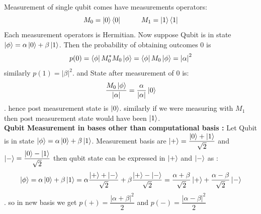 \documentclass[11 pt]{article}
\theoremstyle{definition}
\theoremstyle{remark}
\begin{document}
Measurement of single qubit comes have measurements operators:
$$M_0 = \ket{0}\bra{0} \hspace{1cm} M_1 = \ket{1}\bra{1}$$
Each measurement operators is Hermitian. Now suppose Qubit is in state $\ket{\phi} = \alpha\ket{0} + \beta\ket{1}$. Then the probability of obtaining outcomes 0 is
$$p(0) = \bra{\phi}M_0^{*}M_0\ket{\phi} =\bra{\phi}M_0\ket{\phi} = \left|\alpha\right |^2 $$
similarly $p(1) = \left|\beta\right|^2$. and State after measurement of 0 is:
$$\dfrac{M_0\ket{\phi}}{\left|\alpha\right |} = \dfrac{\alpha}{\left|\alpha\right |}\ket{0}$$.
hence post measurement state is $\ket{0}$. similarly if we were measuring with $M_1$ then post measurement state would have been $\ket{1}$.\\
\textbf{Qubit Measurement in bases other than computational basis :}
Let Qubit is in state $\ket{\phi} = \alpha\ket{0} + \beta\ket{1}$. Measurement basis are $\ket{+} = \dfrac{\ket{0}+\ket{1}}{\sqrt{2}}$ and $\ket{-} = \dfrac{\ket{0}-\ket{1}}{\sqrt{2}}$ then qubit state can be expressed in $\ket{+}$ and $\ket{-}$ as :
$$\ket{\phi} = \alpha\ket{0} + \beta\ket{1} = \alpha\dfrac{\ket{+}+\ket{-}}{\sqrt{2}} + \beta\dfrac{\ket{+}-\ket{-}}{\sqrt{2}} = \dfrac{\alpha+\beta}{\sqrt{2}}\ket{+} + \dfrac{\alpha-\beta}{\sqrt{2}}\ket{-}$$.
so in new basis we get $p(+) =\dfrac{\left|\alpha + \beta\right|^2 }{2}$ and $p(-) =\dfrac{\left|\alpha - \beta\right|^2 }{2}$
\end{document}
